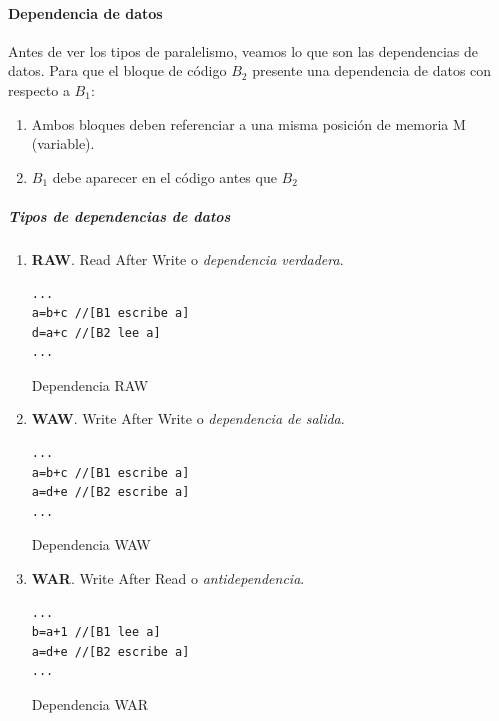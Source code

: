 \documentclass[12pt,spanish]{article}
\begin{document}
\paragraph{Dependencia de datos}
Antes de ver los tipos de paralelismo, veamos lo que son las dependencias de datos.
Para que el bloque de código $B_{2}$ presente una dependencia de datos con respecto a $B_{1}$:
\begin{enumerate}
\item Ambos bloques deben referenciar a una misma posición de memoria M (variable).
\item $B_{1}$ debe aparecer en el código antes que $B_{2}$
\end{enumerate}
\newpage
\subparagraph{Tipos de dependencias de datos}
\begin{enumerate}
\item \textbf{RAW}. Read After Write o \emph{dependencia verdadera}.

\begin{listing}[H]
\begin{verbatim}
...
a=b+c //[B1 escribe a]
d=a+c //[B2 lee a]
...
\end{verbatim}
\caption{Dependencia RAW}
\end{listing}

\item \textbf{WAW}. Write After Write o \emph{dependencia de salida}.

\begin{listing}[H]
\begin{verbatim}
...
a=b+c //[B1 escribe a]
a=d+e //[B2 escribe a]
...
\end{verbatim}
\caption{Dependencia WAW}
\end{listing}

\item \textbf{WAR}. Write After Read o \emph{antidependencia}.

\begin{listing}[H]
\begin{verbatim}
...
b=a+1 //[B1 lee a]
a=d+e //[B2 escribe a]
...
\end{verbatim}
\caption{Dependencia WAR}
\end{listing}

\end{enumerate}
\end{document}
